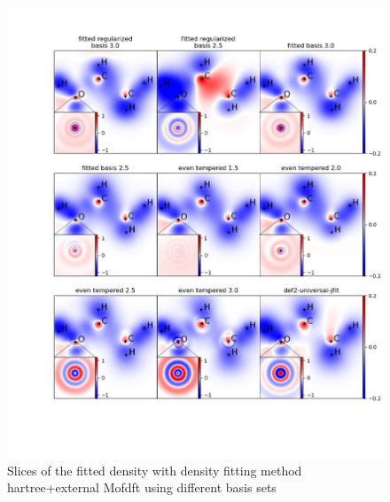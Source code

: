  \begin{figure}
   \centering
   \includegraphics[width=1\textwidth]{chapters/results/results_images/density_fitting_slices2}
     \caption{Slices of the fitted density with density fitting method hartree+external Mofdft using different basis sets}
 \end{figure}


